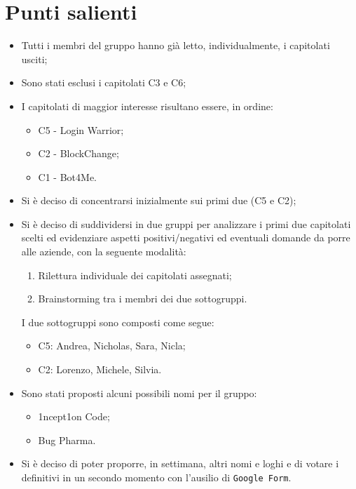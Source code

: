 \documentclass[11pt]{article}
\begin{document}
	\section{Punti salienti}
		\begin{itemize}
			\item Tutti i membri del gruppo hanno già letto, individualmente, i capitolati usciti;
			\item Sono stati esclusi i capitolati C3 e C6;
			\item I capitolati di maggior interesse risultano essere, in ordine:
			\begin{itemize}
				\item C5 - Login Warrior;
				\item C2 - BlockChange;
				\item C1 - Bot4Me.
			\end{itemize}
			\item Si è deciso di concentrarsi inizialmente sui primi due (C5 e C2);
			\item Si è deciso di suddividersi in due gruppi per analizzare i primi due capitolati scelti ed evidenziare
			aspetti positivi/negativi ed eventuali domande da porre alle aziende, con la seguente modalità:
			\begin{enumerate}
				\item Rilettura individuale dei capitolati assegnati;
				\item Brainstorming tra i membri dei due sottogruppi.
			\end{enumerate}
			I due sottogruppi sono composti come segue:
			\begin{itemize}
				\item C5: Andrea, Nicholas, Sara, Nicla;
				\item C2: Lorenzo, Michele, Silvia.
			\end{itemize}
			
			\item Sono stati proposti alcuni possibili nomi per il gruppo:
				\begin{itemize}
					\item 1ncept1on Code;
					\item Bug Pharma.
				\end{itemize}
			\item Si è deciso di poter proporre, in settimana, altri nomi e loghi e di votare i definitivi in un secondo momento
			con l'ausilio di \texttt{Google Form}.
		\end{itemize}	
\end{document}
